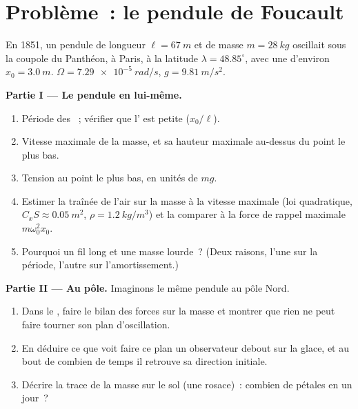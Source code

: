 \section{Problème~: le pendule de Foucault}

\begin{problem}
\label{pb:b1:non-inertial-frames:1}
En 1851, un pendule de longueur $\ell = \qty{67}{m}$ et de masse $m = \qty{28}{kg}$
oscillait sous la coupole du Panthéon, à Paris, à la latitude $\lambda =
48.85^\circ$, avec une  d'environ $x_0 = \qty{3.0}{m}$. $\Omega =
\qty{7.29e-5}{rad/s}$, $g = \qty{9.81}{m/s^2}$.

\medskip
\noindent\textbf{Partie I --- Le pendule en lui-même.}
\begin{enumerate}
  \item Période des ~; vérifier que l' est
        petite ($x_0/\ell$).
  \item Vitesse maximale de la masse, et sa hauteur maximale au-dessus
        du point le plus bas.
  \item Tension au point le plus bas, en unités de $mg$.
  \item Estimer la traînée de l'air sur la masse à la vitesse maximale
        (loi quadratique, $C_xS \approx \qty{0.05}{m^2}$, $\rho = \qty{1.2}{kg/m^3}$)
        et la comparer à la force de rappel maximale $m\omega_0^2x_0$.
  \item Pourquoi un fil long et une masse lourde~? (Deux raisons, l'une
        sur la période, l'autre sur l'amortissement.)
\end{enumerate}

\medskip
\noindent\textbf{Partie II --- Au pôle.}
Imaginons le même pendule au pôle Nord.
\begin{enumerate}[resume]
  \item Dans le , faire le bilan des forces sur
        la masse et montrer que rien ne peut faire tourner son plan
        d'oscillation.
  \item En déduire ce que voit faire ce plan un observateur debout sur la
        glace, et au bout de combien de temps il retrouve sa direction
        initiale.
  \item Décrire la trace de la masse sur le sol (une rosace)~: combien de
        pétales en un jour~?
\end{enumerate}


\end{problem}
